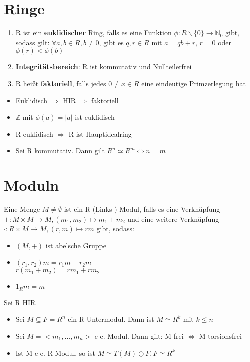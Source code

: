 \section{Ringe}
\begin{definition}
\begin{enumerate}
	\item R ist ein \textbf{euklidischer} Ring, falls es eine Funktion $\phi : R\backslash \{0\} \rightarrow \mathbb{N}_0$ gibt, sodass gilt:
	$\forall a,b \in R, b \neq 0$, gibt es $q,r \in R$ mit $a=qb+r$, $r=0$ oder $\phi(r) < \phi (b)$
	\item \textbf{Integritätsbereich}: R ist kommutativ und Nullteilerfrei
	\item R heißt \textbf{faktoriell}, falls jedes $0 \neq x \in R$ eine eindeutige Primzerlegung hat
\end{enumerate}
\end{definition}
\begin{remark}
\begin{itemize}
	\item Euklidisch $\Rightarrow$ HIR $\Rightarrow$ faktoriell
	\item $\mathbb{Z}$ mit $\phi(a) = |a|$ ist euklidisch
	\item R euklidisch $\Rightarrow$ R ist Hauptidealring
	\item Sei R kommutativ. Dann gilt $R^n \simeq R^m \Leftrightarrow n=m$
\end{itemize}
\end{remark}

\section{Moduln}
\begin{definition}
Eine Menge $M \neq \emptyset$ ist ein R-(Links-) Modul, falls es eine Verknüpfung $+:M \times M \rightarrow M, (m_1,m_2) \mapsto m_1+m_2$ und eine weitere Verknüpfung $\cdot:R \times M \rightarrow M, (r,m) \mapsto rm$ gibt, sodass:
\begin{itemize}
	\item $(M,+)$ ist abelsche Gruppe
	\item $(r_1,r_2)m = r_1 m + r_2 m$\\$r(m_1+m_2) = rm_1+rm_2$
	\item $1_R m = m$
\end{itemize}
\end{definition}
\begin{remark}
Sei R HIR
\begin{itemize}
	\item Sei $ M \subseteq F = R^n$ ein R-Untermodul. Dann ist $M \simeq R^k$ mit $k \leq n$
	\item Sei $M=<m_1,...,m_n>$ e-e. Modul. Dann gilt: M frei $\Leftrightarrow$ M torsionsfrei
	\item Ist M e-e. R-Modul, so ist $M \simeq T(M) \oplus F, F \simeq R^k$
\end{itemize}
\end{remark}

